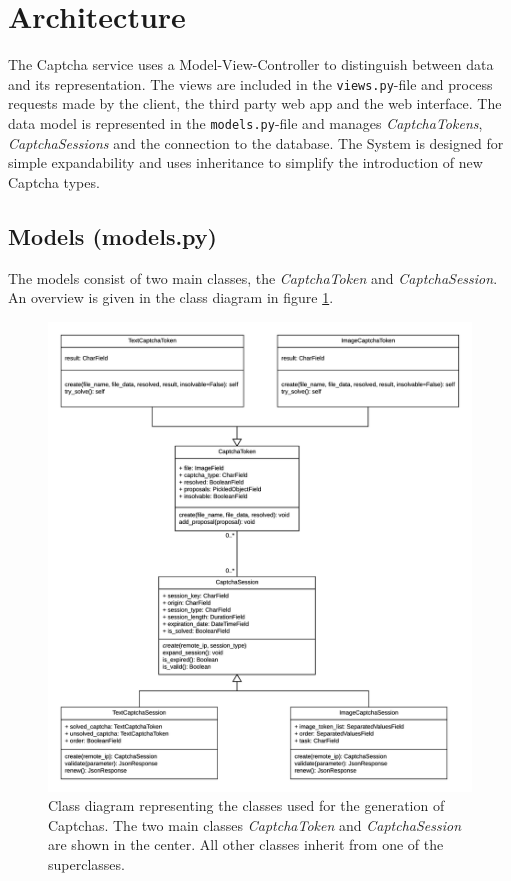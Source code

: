 \section{Architecture}
\label{sec:architecture}

The Captcha service uses a Model-View-Controller to distinguish between data and its representation. The views are included in the \verb|views.py|-file and process requests made by the client, the third party web app and the web interface. 
The data model is represented in the \verb|models.py|-file and manages \emph{CaptchaTokens}, \emph{CaptchaSessions} and the connection to the database.
The System is designed for simple expandability and uses inheritance to simplify the introduction of new Captcha types. 

\subsection{Models (models.py)}

The models consist of two main classes, the \emph{CaptchaToken} and \emph{CaptchaSession}. An overview is given in the class diagram in figure \ref{fig:classdia}. 

\begin{figure}[!h]
\centering
\includegraphics[width=1.1\linewidth]{content/figures/classdiagramm.png}
\caption{Class diagram representing the classes used for the generation of Captchas. The two main classes \emph{CaptchaToken} and \emph{CaptchaSession} are shown in the center. All other classes inherit from one of the superclasses.
}
\label{fig:classdia}
\end{figure}

